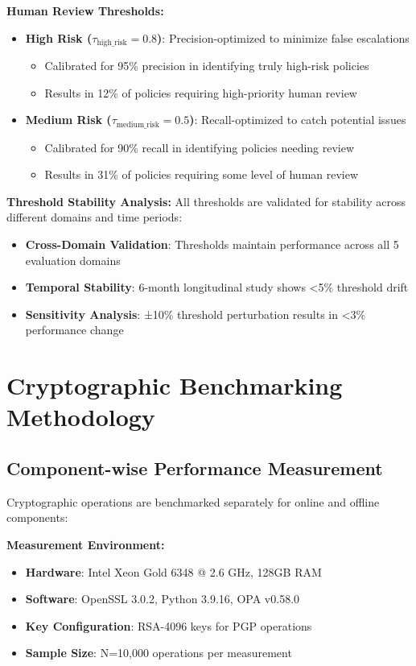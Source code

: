 \documentclass[sigconf,natbib]{acmart}
\begin{document}
\textbf{Human Review Thresholds:}
\begin{itemize}
    \item \textbf{High Risk ($\tau_{\text{high\_risk}} = 0.8$)}: Precision-optimized to minimize false escalations
    \begin{itemize}
        \item Calibrated for 95\% precision in identifying truly high-risk policies
        \item Results in 12\% of policies requiring high-priority human review
    \end{itemize}
    \item \textbf{Medium Risk ($\tau_{\text{medium\_risk}} = 0.5$)}: Recall-optimized to catch potential issues
    \begin{itemize}
        \item Calibrated for 90\% recall in identifying policies needing review
        \item Results in 31\% of policies requiring some level of human review
    \end{itemize}
\end{itemize}

\textbf{Threshold Stability Analysis:}
All thresholds are validated for stability across different domains and time periods:
\begin{itemize}
    \item \textbf{Cross-Domain Validation}: Thresholds maintain performance across all 5 evaluation domains
    \item \textbf{Temporal Stability}: 6-month longitudinal study shows <5\% threshold drift
    \item \textbf{Sensitivity Analysis}: ±10\% threshold perturbation results in <3\% performance change
\end{itemize}

\section{Cryptographic Benchmarking Methodology}
\label{app:crypto_benchmarking}

\subsection{Component-wise Performance Measurement}
Cryptographic operations are benchmarked separately for online and offline components:

\textbf{Measurement Environment:}
\begin{itemize}
    \item \textbf{Hardware}: Intel Xeon Gold 6348 @ 2.6 GHz, 128GB RAM
    \item \textbf{Software}: OpenSSL 3.0.2, Python 3.9.16, OPA v0.58.0
    \item \textbf{Key Configuration}: RSA-4096 keys for PGP operations
    \item \textbf{Sample Size}: N=10,000 operations per measurement
\end{itemize}
\end{document}
